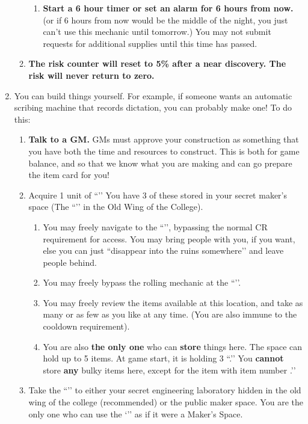 \documentclass[green]{GL2020}
\begin{document}
\begin{enumerate}
\begin{enumerate}
    \begin{enumerate}
      \item \textbf{Start a 6 hour timer or set an alarm for 6 hours from now.} (or if 6 hours from now would be the middle of the night, you just can’t use this mechanic until tomorrow.) You may not submit requests for additional supplies until this time has passed.
    \end{enumerate}
    \item \textbf{The risk counter will reset to 5\% after a near discovery. The risk will never return to zero.}
  \end{enumerate}
  \item You can build things yourself. For example, if someone wants an automatic scribing machine that records dictation, you can probably make one! To do this:
  \begin{enumerate}
    \item \textbf{Talk to a GM.} GMs must approve your construction as something that you have both the time and resources to construct. This is both for game balance, and so that we know what you are making and can go prepare the item card for you!
    \item Acquire 1 unit of ``\iMagitechParts{}’’ You have 3 of these stored in your secret maker’s space (The ``\sAlchemyLabOne{}’’ in the Old Wing of the College).
  \begin{enumerate}
    \item You may freely navigate to the ``\sAlchemyLabOne{}’’, bypassing the normal CR requirement for access. You may bring people with you, if you want, else you can just ``disappear into the ruins somewhere'’ and leave people behind.
    \item You may freely bypass the rolling mechanic at  the ``\sAlchemyLabOne{}’’.
    \item You may freely review the items available at this location, and take as many or as few as you like at any time. (You are also immune to the cooldown requirement).
    \item You are also \textbf{the only one} who can \textbf{store} things here. The space can hold up to 5 items. At game start, it is holding 3 ``\iMagitechParts{}.’’ You \textbf{cannot} store \textbf{any} bulky items here, except for the item with item number \iAvatarRabbit{\MYnumber}.’’
  \end{enumerate}
  \item Take the ``\iMagitechParts{}’’ to either your secret engineering laboratory hidden in the old wing of the college (recommended) or the public maker space. You are the only one who can use the `\sAlchemyLabOne{}’’ as if it were a Maker’s Space.

\end{enumerate}
\end{enumerate}
\end{document}

